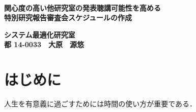 \documentclass[a4paper,12pt,fleqn]{jarticle}
\begin{document}
\pagestyle{empty}
\begin{center}
 \ \\
 \vspace{8cm}
 \begin{Large}
   {\bf 関心度の高い他研究室の発表聴講可能性を高める\\特別研究報告審査会スケジュールの作成}\\
 \end{Large}
 \vspace{2cm}
 \begin{large}
  {\bf システム最適化研究室} \\
  {\bf 都 14-0033　大原　源悠}
 \end{large}
\end{center}


\newpage
\pagestyle{plain}
\tableofcontents

\newpage
{}
\section{はじめに}
人生を有意義に過ごすためには時間の使い方が重要である．
\end{document}
